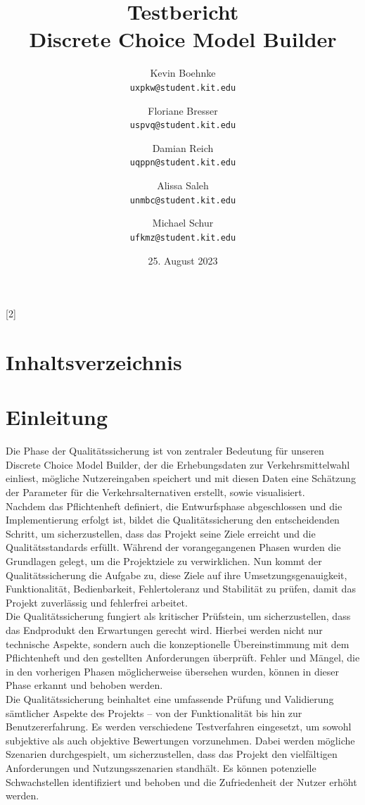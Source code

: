 \documentclass{article}
\title{Testbericht \\ \large Discrete Choice Model Builder}
\author{Kevin Boehnke \\ \texttt{uxpkw@student.kit.edu}
\and Floriane Bresser \\ \texttt{uspvq@student.kit.edu}
\and Damian Reich \\ \texttt{uqppn@student.kit.edu}
\and Alissa Saleh \\ \texttt{unmbc@student.kit.edu}
\and Michael Schur \\ \texttt{ufkmz@student.kit.edu}}
\date{25. August 2023}
\begin{document}
\maketitle
\thispagestyle{empty}
\newpage
\startcontents[maintableofcontents]
[2]{\section*{Inhaltsverzeichnis}}
\thispagestyle{empty}
\newpage
{}

\section{Einleitung}
Die Phase der Qualitätssicherung ist von zentraler Bedeutung für unseren Discrete Choice Model Builder, der die Erhebungsdaten zur Verkehrsmittelwahl einliest, mögliche Nutzereingaben speichert und mit diesen Daten eine Schätzung der Parameter für die Verkehrsalternativen erstellt, sowie visualisiert.\\

Nachdem das Pflichtenheft definiert, die Entwurfsphase abgeschlossen und die Implementierung erfolgt ist, bildet die Qualitätssicherung den entscheidenden Schritt, um sicherzustellen, dass das Projekt seine Ziele erreicht und die Qualitätsstandards erfüllt. Während der vorangegangenen Phasen wurden die Grundlagen gelegt, um die Projektziele zu verwirklichen. Nun kommt der Qualitätssicherung die Aufgabe zu, diese Ziele auf ihre Umsetzungsgenauigkeit, Funktionalität, Bedienbarkeit, Fehlertoleranz und Stabilität zu prüfen, damit das Projekt zuverlässig und fehlerfrei arbeitet.\\

Die Qualitätssicherung fungiert als kritischer Prüfstein, um sicherzustellen, dass das Endprodukt den Erwartungen gerecht wird. Hierbei werden nicht nur technische Aspekte, sondern auch die konzeptionelle Übereinstimmung mit dem Pflichtenheft und den gestellten Anforderungen überprüft. Fehler und Mängel, die in den vorherigen Phasen möglicherweise übersehen wurden, können in dieser Phase erkannt und behoben werden.\\

Die Qualitätssicherung beinhaltet eine umfassende Prüfung und Validierung sämtlicher Aspekte des Projekts – von der Funktionalität bis hin zur Benutzererfahrung. Es werden verschiedene Testverfahren eingesetzt, um sowohl subjektive als auch objektive Bewertungen vorzunehmen. Dabei werden mögliche Szenarien durchgespielt, um sicherzustellen, dass das Projekt den vielfältigen Anforderungen und Nutzungsszenarien standhält. Es können potenzielle Schwachstellen identifiziert und behoben und die Zufriedenheit der Nutzer erhöht werden.\\
\end{document}
